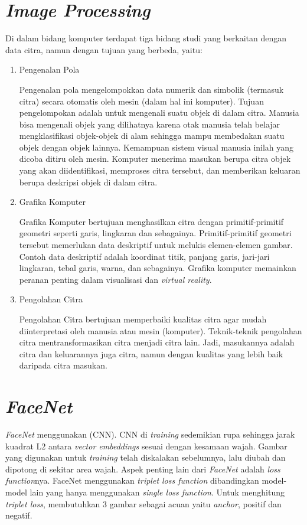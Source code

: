 \section{\textit{Image Processing}}
Di dalam bidang komputer terdapat tiga bidang studi yang
berkaitan dengan data citra, namun dengan tujuan yang berbeda\citep{Umam2016},
yaitu:

\begin{enumerate}
  \item Pengenalan Pola
    
  Pengenalan pola mengelompokkan data numerik dan simbolik (termasuk citra) secara otomatis oleh mesin (dalam hal ini
  komputer). Tujuan pengelompokan adalah untuk mengenali
  suatu objek di dalam citra. Manusia bisa mengenali objek
  yang dilihatnya karena otak manusia telah belajar mengklasifikasi objek-objek di alam sehingga mampu membedakan suatu objek dengan objek lainnya. Kemampuan sistem visual
  manusia inilah yang dicoba ditiru oleh mesin. Komputer menerima masukan berupa citra objek yang akan diidentifikasi,
  memproses citra tersebut, dan memberikan keluaran berupa
  deskripsi objek di dalam citra.

  \item Grafika Komputer
  
  Grafika Komputer bertujuan menghasilkan citra dengan primitif-primitif geometri seperti garis, lingkaran dan sebagainya. Primitif-primitif geometri tersebut memerlukan data deskriptif untuk
  melukis elemen-elemen gambar. Contoh data deskriptif adalah koordinat titik, panjang garis, jari-jari lingkaran, tebal
  garis, warna, dan sebagainya. Grafika komputer memainkan peranan penting dalam visualisasi dan \textit{virtual reality}.

  \item Pengolahan Citra
    
  Pengolahan Citra bertujuan memperbaiki kualitas citra agar
  mudah diinterpretasi oleh manusia atau mesin (komputer).
  Teknik-teknik pengolahan citra mentransformasikan citra menjadi citra lain. Jadi, masukannya adalah citra dan keluarannya
  juga citra, namun dengan kualitas yang lebih baik daripada
  citra masukan.
\end{enumerate}

\section{\textit{FaceNet}}
\textit{FaceNet} menggunakan (CNN). CNN di \textit{training} sedemikian rupa sehingga jarak kuadrat L2 antara \textit{vector embeddings} sesuai dengan kesamaan wajah.
Gambar yang digunakan untuk \textit{training} telah diskalakan sebelumnya, lalu diubah dan dipotong di sekitar area wajah.
Aspek penting lain dari \textit{FaceNet} adalah \textit{loss function}nya. FaceNet menggunakan \textit{triplet loss function} dibandingkan model-model lain yang hanya menggunakan \textit{single loss function}.
Untuk menghitung \textit{triplet loss}, membutuhkan 3 gambar sebagai acuan yaitu \textit{anchor}, positif dan negatif\citep{Facenet2015}.

